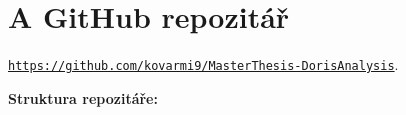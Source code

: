 
\appendix
\chapter*{A GitHub repozitář}
\href{https://github.com/kovarmi9/MasterThesis-DorisAnalysis}{\texttt{https://github.com/kovarmi9/MasterThesis-DorisAnalysis}}.
\begin{center}
\end{center}
\textbf{Struktura repozitáře:}
